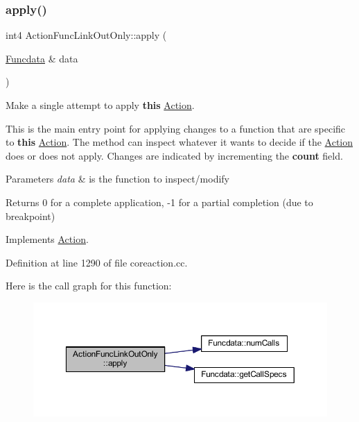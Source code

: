 \subsubsection{\texorpdfstring{apply()}{apply()}}
{\footnotesize\ttfamily int4 Action\+Func\+Link\+Out\+Only\+::apply (\begin{DoxyParamCaption}\item[{\mbox{\hyperlink{class_funcdata}{Funcdata}} \&}]{data }\end{DoxyParamCaption})\hspace{0.3cm}{\ttfamily [virtual]}}



Make a single attempt to apply {\bfseries{this}} \mbox{\hyperlink{class_action}{Action}}. 

This is the main entry point for applying changes to a function that are specific to {\bfseries{this}} \mbox{\hyperlink{class_action}{Action}}. The method can inspect whatever it wants to decide if the \mbox{\hyperlink{class_action}{Action}} does or does not apply. Changes are indicated by incrementing the {\bfseries{count}} field. 
\begin{DoxyParams}{Parameters}
{\em data} & is the function to inspect/modify \\
\hline
\end{DoxyParams}
\begin{DoxyReturn}{Returns}
0 for a complete application, -\/1 for a partial completion (due to breakpoint) 
\end{DoxyReturn}


Implements \mbox{\hyperlink{class_action_aac1c3999d6c685b15f5d9765a4d04173}{Action}}.



Definition at line 1290 of file coreaction.\+cc.

Here is the call graph for this function\+:
\nopagebreak
\begin{figure}[H]
\begin{center}
\leavevmode
\includegraphics[width=350pt]{class_action_func_link_out_only_a68364ccae05a65b54188cd92c876d01f_cgraph}
\end{center}
\end{figure}
\mbox{\label{class_action_func_link_out_only_aea7020b6da99752e4bf1b3edc3a5de53}} 
